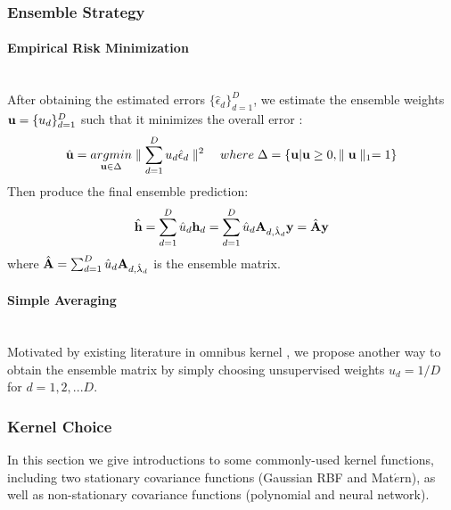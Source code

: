 \documentclass[11pt]{article}
\begin{document}
\subsubsection{{Ensemble Strategy}}
\paragraph{Empirical Risk Minimization}\mbox{}\\
After obtaining the estimated errors $\{\hat{\epsilon}_d\}_{d=1}^D$, we estimate the ensemble weights ${\bf u}=\{u_d\}_{d=1}^D$ such that it minimizes the overall error \citep{liu_robust_2017}:
\begin{align*}
\hat{{\bf u}}=\underset{{\bf u} \in \Delta}{argmin}\parallel \sum_{d=1}^Du_d\hat{\epsilon}_d\parallel^2 \quad where\; \Delta=\{{\bf u} | {\bf u} \geq 0, \parallel {\bf u} \parallel_1=1\}
\end{align*}
Then produce the final ensemble prediction:
\begin{align*}
\hat{{\bf h}}=\sum_{d=1}^D \hat{u}_d {\bf h}_d=\sum_{d=1}^D \hat{u}_d {\bf A}_{d,\hat{\lambda}_d}{\bf y}=\hat{{\bf A}}{\bf y}
\end{align*}
where $\hat{{\bf A}}=\sum_{d=1}^D \hat{u}_d {\bf A}_{d,\hat{\lambda}_d}$ is the ensemble matrix.

\paragraph{Simple Averaging}\mbox{}\\
Motivated by existing literature in omnibus kernel \citep{zhan_fast_2017}, we propose another way to obtain the ensemble matrix by simply choosing unsupervised weights $u_d=1/D$ for $d=1,2,...D$.

\subsubsection{{Kernel Choice}}
In this section we give introductions to some commonly-used kernel functions, including two stationary covariance functions (Gaussian RBF and Mat$\acute{e}$rn), as well as non-stationary covariance functions (polynomial and neural network).
\end{document}
